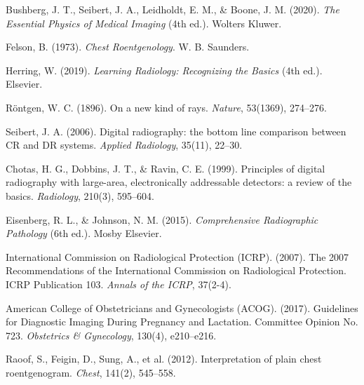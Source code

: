 \documentclass[11pt,a4paper]{article}
\begin{document}
\begin{enumerate}[label={[\arabic*]},leftmargin=*]
    \item Bushberg, J. T., Seibert, J. A., Leidholdt, E. M., \& Boone, J. M. (2020). \textit{The Essential Physics of Medical Imaging} (4th ed.). Wolters Kluwer.
    \item Felson, B. (1973). \textit{Chest Roentgenology}. W. B. Saunders.
    \item Herring, W. (2019). \textit{Learning Radiology: Recognizing the Basics} (4th ed.). Elsevier.
    \item Röntgen, W. C. (1896). On a new kind of rays. \textit{Nature}, 53(1369), 274--276.
    \item Seibert, J. A. (2006). Digital radiography: the bottom line comparison between CR and DR systems. \textit{Applied Radiology}, 35(11), 22--30.
    \item Chotas, H. G., Dobbins, J. T., \& Ravin, C. E. (1999). Principles of digital radiography with large-area, electronically addressable detectors: a review of the basics. \textit{Radiology}, 210(3), 595--604.
    \item Eisenberg, R. L., \& Johnson, N. M. (2015). \textit{Comprehensive Radiographic Pathology} (6th ed.). Mosby Elsevier.
    \item International Commission on Radiological Protection (ICRP). (2007). The 2007 Recommendations of the International Commission on Radiological Protection. ICRP Publication 103. \textit{Annals of the ICRP}, 37(2-4).
    \item American College of Obstetricians and Gynecologists (ACOG). (2017). Guidelines for Diagnostic Imaging During Pregnancy and Lactation. Committee Opinion No. 723. \textit{Obstetrics \& Gynecology}, 130(4), e210--e216.
    \item Raoof, S., Feigin, D., Sung, A., et al. (2012). Interpretation of plain chest roentgenogram. \textit{Chest}, 141(2), 545--558.
\end{enumerate}
\end{document}
